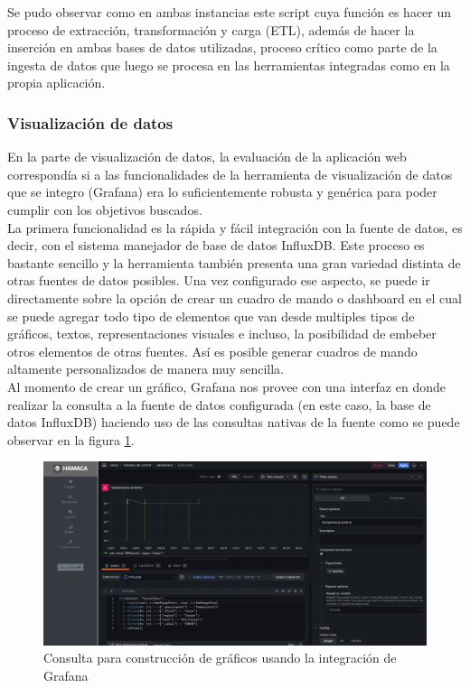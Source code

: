 Se pudo observar como en ambas instancias este script cuya función es hacer un proceso de extracción, transformación y carga (ETL), además de hacer la inserción en ambas bases de datos utilizadas, proceso crítico como parte de la ingesta de datos que luego se procesa en las herramientas integradas como en la propia aplicación. 

\subsubsection{Visualización de datos}
En la parte de visualización de datos, la evaluación de la aplicación web correspondía si a las funcionalidades de la herramienta de visualización de datos que se integro (Grafana) era lo suficientemente robusta y genérica para poder cumplir con los objetivos buscados.\\

La primera funcionalidad es la rápida y fácil integración con la fuente de datos, es decir, con el sistema manejador de base de datos InfluxDB. Este proceso es bastante sencillo y la herramienta también presenta una gran variedad distinta de otras fuentes de datos posibles. Una vez configurado ese aspecto, se puede ir directamente sobre la opción de crear un cuadro de mando o dashboard en el cual se puede agregar todo tipo de elementos que van desde multiples tipos de gráficos, textos, representaciones visuales e incluso, la posibilidad de embeber otros elementos de otras fuentes. Así es posible generar cuadros de mando altamente personalizados de manera muy sencilla.\\

Al momento de crear un gráfico, Grafana nos provee con una interfaz en donde realizar la consulta a la fuente de datos configurada (en este caso, la base de datos InfluxDB) haciendo uso de las consultas nativas de la fuente como se puede observar en la figura \ref{fig:consulta_grafana}.\\
\begin{figure}[htb]
\centering
\includegraphics[scale=0.225]{./Figuras/consulta_grafana.png}
\caption{Consulta para construcción de gráficos usando la integración de Grafana}
\label{fig:consulta_grafana}
\vspace*{-10pt}
\end{figure}

